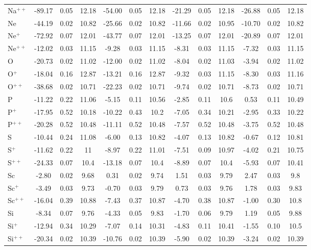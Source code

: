 \begin{longtable}{l!{\vrule width 0.25pt}ccc!{\vrule width 0.25pt}ccc!{\vrule width 0.25pt}ccc!{\vrule width 0.25pt}ccc}
Na$^{++}$ & -89.17 & 0.05 & 12.18 & -54.00 & 0.05 & 12.18 & -21.29 & 0.05 & 12.18 & -26.88 & 0.05 & 12.18 \\
Ne & -44.19 & 0.02 & 10.82 & -25.66 & 0.02 & 10.82 & -11.66 & 0.02 & 10.95 & -10.70 & 0.02 & 10.82 \\
Ne$^+$ & -72.92 & 0.07 & 12.01 & -43.77 & 0.07 & 12.01 & -13.25 & 0.07 & 12.01 & -20.89 & 0.07 & 12.01 \\
Ne$^{++}$ & -12.02 & 0.03 & 11.15 & -9.28 & 0.03 & 11.15 & -8.31 & 0.03 & 11.15 & -7.32 & 0.03 & 11.15 \\
O & -20.73 & 0.02 & 11.02 & -12.00 & 0.02 & 11.02 & -8.04 & 0.02 & 11.03 & -3.94 & 0.02 & 11.02 \\
O$^+$ & -18.04 & 0.16 & 12.87 & -13.21 & 0.16 & 12.87 & -9.32 & 0.03 & 11.15 & -8.30 & 0.03 & 11.16 \\
O$^{++}$ & -38.68 & 0.02 & 10.71 & -22.23 & 0.02 & 10.71 & -9.74 & 0.02 & 10.71 & -8.73 & 0.02 & 10.71 \\
P & -11.22 & 0.22 & 11.06 & -5.15 & 0.11 & 10.56 & -2.85 & 0.11 & 10.6 & 0.53 & 0.11 & 10.49 \\
P$^+$ & -17.95 & 0.52 & 10.18 & -10.22 & 0.43 & 10.2 & -7.05 & 0.34 & 10.21 & -2.95 & 0.33 & 10.22 \\
P$^{++}$ & -20.28 & 0.52 & 10.48 & -11.11 & 0.52 & 10.48 & -7.57 & 0.52 & 10.48 & -3.75 & 0.52 & 10.48 \\
S & -10.44 & 0.24 & 11.08 & -6.00 & 0.13 & 10.82 & -4.07 & 0.13 & 10.82 & -0.67 & 0.12 & 10.81 \\
S$^+$ & -11.62 & 0.22 & 11 & -8.97 & 0.22 & 11.01 & -7.51 & 0.09 & 10.97 & -4.02 & 0.21 & 10.75 \\
S$^{++}$ & -24.33 & 0.07 & 10.4 & -13.18 & 0.07 & 10.4 & -8.89 & 0.07 & 10.4 & -5.93 & 0.07 & 10.41 \\
Sc & -2.80 & 0.02 & 9.68 & 0.31 & 0.02 & 9.74 & 1.51 & 0.03 & 9.79 & 2.47 & 0.03 & 9.8 \\
Sc$^+$ & -3.49 & 0.03 & 9.73 & -0.70 & 0.03 & 9.79 & 0.73 & 0.03 & 9.76 & 1.78 & 0.03 & 9.83 \\
Sc$^{++}$ & -16.04 & 0.39 & 10.88 & -7.43 & 0.37 & 10.87 & -4.70 & 0.38 & 10.87 & -1.00 & 0.30 & 10.8 \\
Si & -8.34 & 0.07 & 9.76 & -4.33 & 0.05 & 9.83 & -1.70 & 0.06 & 9.79 & 1.19 & 0.05 & 9.88 \\
Si$^+$ & -12.94 & 0.34 & 10.29 & -7.07 & 0.14 & 10.31 & -4.83 & 0.11 & 10.41 & -1.55 & 0.10 & 10.5 \\
Si$^{++}$ & -20.34 & 0.02 & 10.39 & -10.76 & 0.02 & 10.39 & -5.90 & 0.02 & 10.39 & -3.24 & 0.02 & 10.39 \\

\end{longtable}
